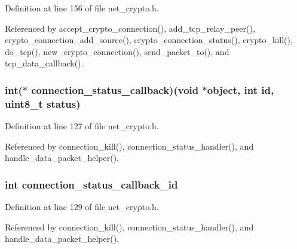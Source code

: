 Definition at line 156 of file net\+\_\+crypto.\+h.



Referenced by accept\+\_\+crypto\+\_\+connection(), add\+\_\+tcp\+\_\+relay\+\_\+peer(), crypto\+\_\+connection\+\_\+add\+\_\+source(), crypto\+\_\+connection\+\_\+status(), crypto\+\_\+kill(), do\+\_\+tcp(), new\+\_\+crypto\+\_\+connection(), send\+\_\+packet\+\_\+to(), and tcp\+\_\+data\+\_\+callback().

\hypertarget{struct_crypto___connection_ad3c663c15ca97b75951ea711b522c049}{
\subsubsection[{connection\+\_\+status\+\_\+callback}]{\setlength{\rightskip}{0pt plus 5cm}int($\ast$ connection\+\_\+status\+\_\+callback)(void $\ast$object, int id, uint8\+\_\+t {\bf status})}}\label{struct_crypto___connection_ad3c663c15ca97b75951ea711b522c049}


Definition at line 127 of file net\+\_\+crypto.\+h.



Referenced by connection\+\_\+kill(), connection\+\_\+status\+\_\+handler(), and handle\+\_\+data\+\_\+packet\+\_\+helper().

\hypertarget{struct_crypto___connection_a3cd6f7015115dc493f86be91526eb9f8}{
\subsubsection[{connection\+\_\+status\+\_\+callback\+\_\+id}]{\setlength{\rightskip}{0pt plus 5cm}int connection\+\_\+status\+\_\+callback\+\_\+id}}\label{struct_crypto___connection_a3cd6f7015115dc493f86be91526eb9f8}


Definition at line 129 of file net\+\_\+crypto.\+h.



Referenced by connection\+\_\+kill(), connection\+\_\+status\+\_\+handler(), and handle\+\_\+data\+\_\+packet\+\_\+helper().

